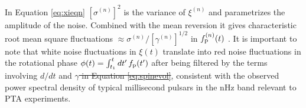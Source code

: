 \documentclass[fleqn,usenatbib,useAMS]{mnras}
\providecommand{\DIFadd}[1]{{\protect\color{blue}\uwave{#1}}} %
\providecommand{\DIFdel}[1]{{\protect\color{red}\sout{#1}}}                      %
\providecommand{\DIFaddbegin}{} %
\providecommand{\DIFaddend}{} %
\providecommand{\DIFdelbegin}{} %
\providecommand{\DIFdelend}{} %
\newcommand{\DIFscaledelfig}{0.5}
\newlength{\DIFdelgraphicswidth} %
\newlength{\DIFdelgraphicsheight} %
\newcommand{\DIFaddincludegraphics}[2][]{{\color{blue}\fbox{\DIFOincludegraphics[#1]{#2}}}} %
\newcommand{\DIFdelincludegraphics}[2][]{%
\sbox{\DIFdelgraphicsbox}{\DIFOincludegraphics[#1]{#2}}%
\settoboxwidth{\DIFdelgraphicswidth}{\DIFdelgraphicsbox} %
\settoboxtotalheight{\DIFdelgraphicsheight}{\DIFdelgraphicsbox} %
\scalebox{\DIFscaledelfig}{%
\parbox[b]{\DIFdelgraphicswidth}{\usebox{\DIFdelgraphicsbox}\\[-\baselineskip] \rule{\DIFdelgraphicswidth}{0em}}\llap{\resizebox{\DIFdelgraphicswidth}{\DIFdelgraphicsheight}{%
\setlength{\unitlength}{\DIFdelgraphicswidth}%
\begin{picture}(1,1)%
\thicklines\linethickness{2pt} %
{\color[rgb]{1,0,0}\put(0,0){\framebox(1,1){}}}%
{\color[rgb]{1,0,0}\put(0,0){\line( 1,1){1}}}%
{\color[rgb]{1,0,0}\put(0,1){\line(1,-1){1}}}%
\end{picture}%
}\hspace*{3pt}}} %
} %
\DeclareRobustCommand{\DIFaddbegin}{\DIFOaddbegin \let\includegraphics\DIFaddincludegraphics} %
\DeclareRobustCommand{\DIFaddend}{\DIFOaddend \let\includegraphics\DIFOincludegraphics} %
\DeclareRobustCommand{\DIFdelbegin}{\DIFOdelbegin \let\includegraphics\DIFdelincludegraphics} %
\DeclareRobustCommand{\DIFdelend}{\DIFOaddend \let\includegraphics\DIFOincludegraphics} %
\begin{document}
In Equation \eqref{eq:xieqn} $[\sigma^{(n)}]^2$ is the variance of $\xi^{(n)}$ and parametrizes the amplitude of the noise. Combined with the mean reversion it gives characteristic root mean square fluctuations $\approx \sigma^{(n)} / [\gamma^{(n)}]^{1/2}$ in $f_{\rm p}^{(n)}(t)$ \citep{gardiner2009stochastic}. It is important to note that white noise fluctuations in $\xi(t)$ translate into red noise fluctuations in the rotational phase $\phi(t) = \int_{t_1}^t dt' \, f_{\rm p}(t')$ after being filtered by the terms involving $d/dt$ and \DIFdelbegin \DIFdel{$\gamma$ in Equation \eqref{eq:spinevol}}\DIFdelend \DIFaddbegin \DIFadd{$\gamma^{(n)}$ in Equation \eqref{eq:frequency_evolution}}\DIFaddend , consistent with the observed power spectral density of typical millisecond pulsars in the nHz band relevant to PTA experiments. \newline 
\end{document}
